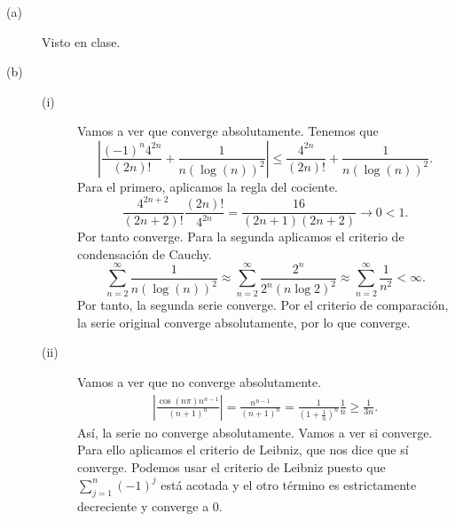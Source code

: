 \documentclass{article}
\begin{document}
\begin{sol}
\begin{description}
\item[(a)] Visto en clase.
\item[(b)] 
	\begin{description}
	\item[(i)] Vamos a ver que converge absolutamente. Tenemos que
	\[ \left|\frac{\left(-1\right)^{n}4^{2n}}{\left(2n\right)!} + \frac{1}{n\left(\log\left(n\right)\right)^{2}}\right| \leq \frac{4^{2n}}{\left(2n\right)!} + \frac{1}{n\left(\log\left(n\right)\right)^{2}}.\]
Para el primero, aplicamos la regla del cociente.
\[\frac{4^{2n+2}}{\left(2n+2\right)!}\frac{\left(2n\right)!}{4^{2n}} = \frac{16}{\left(2n+1\right)\left(2n+2\right)}\to 0 < 1 .\]
Por tanto converge. Para la segunda aplicamos el criterio de condensación de Cauchy.
\[\sum^{\infty}_{n = 2}\frac{1}{n\left(\log\left(n\right)\right)^{2}} \approx \sum^{\infty}_{n=2}\frac{2^{n}}{2^{n}\left(n\log2\right)^{2}} \approx \sum^{\infty}_{n=2}\frac{1}{n^{2}} < \infty .\]
Por tanto, la segunda serie converge. Por el criterio de comparación, la serie original converge absolutamente, por lo que converge.
\item[(ii)] Vamos a ver que no converge absolutamente.
\[
\begin{split}
\left|\frac{\cos\left(n\pi \right)n^{n-1}}{\left(n+1\right)^{n}}\right| = \frac{n^{n-1}}{\left(n+1\right)^{n}} = \frac{1}{\left(1+\frac{1}{n}\right)^{n}} \frac{1}{n} \geq  \frac{1}{3n} .
\end{split}
\]
Así, la serie no converge absolutamente. Vamos a ver si converge. Para ello aplicamos el criterio de Leibniz, que nos dice que sí converge. Podemos usar el criterio de Leibniz puesto que $\displaystyle \sum^{n}_{j = 1}\left(-1\right)^{j} $ está acotada y el otro término es estrictamente decreciente y converge a 0.
	\end{description}
\end{description}
\end{sol}
\end{document}

